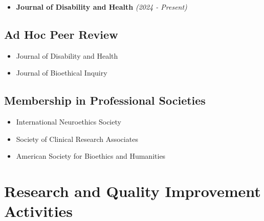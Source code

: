 \documentclass[
  letterpaper,
  DIV=11,
  numbers=noendperiod]{scrartcl}
\providecommand{\tightlist}{%
  \setlength{\itemsep}{0pt}\setlength{\parskip}{0pt}}\usepackage{longtable,booktabs,array}
\begin{document}
\begin{itemize}
\tightlist
\item
  \textbf{Journal of Disability and Health} \emph{(2024 - Present)}
\end{itemize}

\subsection{Ad Hoc Peer Review}\label{ad-hoc-peer-review}

\begin{itemize}
\tightlist
\item
  Journal of Disability and Health
\item
  Journal of Bioethical Inquiry
\end{itemize}

\subsection{Membership in Professional
Societies}\label{membership-in-professional-societies}

\begin{itemize}
\tightlist
\item
  International Neuroethics Society
\item
  Society of Clinical Research Associates
\item
  American Society for Bioethics and Humanities
\end{itemize}

\section{Research and Quality Improvement
Activities}\label{research-and-quality-improvement-activities}
\end{document}
